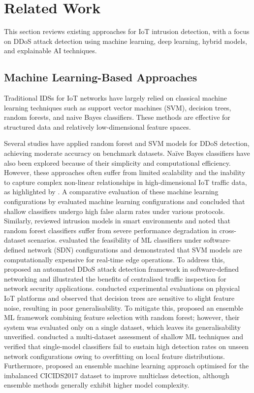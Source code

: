 \documentclass[a4paper,fleqn]{cas-sc}
\begin{document}
\section{Related Work}
\label{sec:related}
This section reviews existing approaches for IoT intrusion detection, with a focus on DDoS attack detection using machine learning, deep learning, hybrid models, and explainable AI techniques.

\subsection{Machine Learning-Based Approaches}

Traditional IDSs for IoT networks have largely relied on classical machine learning techniques such as support vector machines (SVM), decision trees, random forests, and naive Bayes classifiers. These methods are effective for structured data and relatively low-dimensional feature spaces.

Several studies have applied random forest and SVM models for DDoS detection, achieving moderate accuracy on benchmark datasets. Naïve Bayes classifiers have also been explored because of their simplicity and computational efficiency. However, these approaches often suffer from limited scalability and the inability to capture complex non-linear relationships in high-dimensional IoT traffic data, as highlighted by \cite{sarhan2020evaluation}. A comparative evaluation of these machine learning configurations by \cite{verma2020machine} evaluated machine learning configurations and concluded that shallow classifiers undergo high false alarm rates under various protocols. Similarly, \cite{susilo2020security} reviewed intrusion models in smart environments and noted that random forest classifiers suffer from severe performance degradation in cross-dataset scenarios. \cite{bhamare2020machine} evaluated the feasibility of ML classifiers under software-defined network (SDN) configurations and demonstrated that SVM models are computationally expensive for real-time edge operations. To address this, \cite{AHUJA2021103108} proposed an automated DDoS attack detection framework in software-defined networking and illustrated the benefits of centralised traffic inspection for network security applications. \cite{churcher2021machine} conducted experimental evaluations on physical IoT platforms and observed that decision trees are sensitive to slight feature noise, resulting in poor generalisability. To mitigate this, \cite{soe2020machine} proposed an ensemble ML framework combining feature selection with random forest; however, their system was evaluated only on a single dataset, which leaves its generalisability unverified. \cite{habib2023multi} conducted a multi-dataset assessment of shallow ML techniques and verified that single-model classifiers fail to sustain high detection rates on unseen network configurations owing to overfitting on local feature distributions. Furthermore, \cite{indra2024ensemble} proposed an ensemble machine learning approach optimised for the imbalanced CICIDS2017 dataset to improve multiclass detection, although ensemble methods generally exhibit higher model complexity.
\end{document}
